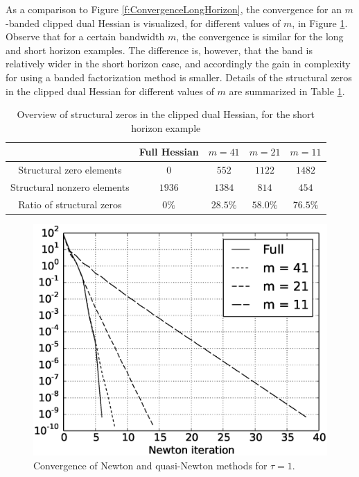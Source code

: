 As a comparison to Figure \ref{f:ConvergenceLongHorizon}, the convergence for an $m$-banded clipped dual Hessian is visualized, for different values of $m$, in Figure \ref{f:ConvergenceShortHorizon}. Observe that for a certain bandwidth $m$, the convergence is similar for the long and short horizon examples. The difference is, however, that the band is relatively wider in the short horizon case, and accordingly the gain in complexity for using a banded factorization method is smaller. Details of the structural zeros in the clipped dual Hessian for different values of $m$ are summarized in Table \ref{t:StructureShortHorizon}.

\begin{table}[h]
\centering
\caption{Overview of structural zeros in the clipped dual Hessian, for the short horizon example}
\begin{tabular}{c|cccc} \label{t:StructureShortHorizon}
 & Full Hessian & $m=41$ & $m=21$ & $m=11$ \\
 \hline \hline
 Structural zero elements & $0$ & $552$ & $1122$ & $1482$ \\
 Structural nonzero elements & $1936$ & $1384$ & $814$ & $454$ \\
 \hline 
 Ratio of structural zeros & $0\%$ & $28.5\%$ & $58.0\%$ & $76.5\%$ \\ 
\end{tabular}
\end{table}

\begin{figure}[h]
\centering
\includegraphics[scale=0.4]{./Figures/ConvergenceShortHorizon.eps}
\caption{Convergence of Newton and quasi-Newton methods for $\tau=1$.}
\label{f:ConvergenceShortHorizon}
\end{figure}

